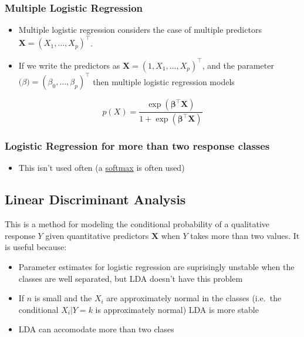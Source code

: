 \documentclass[11pt]{article}
\providecommand{\tightlist}{%
      \setlength{\itemsep}{0pt}\setlength{\parskip}{0pt}}
\begin{document}
    \hypertarget{multiple-logistic-regression}{%
\subsubsection{Multiple Logistic
Regression}\label{multiple-logistic-regression}}

    \begin{itemize}
\item
  Multiple logistic regression considers the case of multiple predictors
  \(\mathbf{X} = (X_1,\dots, X_p)^\top\).
\item
  If we write the predictors as
  \(\mathbf{X} = (1, X_1, \dots, X_p)^\top\), and the parameter
  \(\boldsymbol(\beta) = (\beta_0, \dots, \beta_p)^\top\) then multiple
  logistic regression models
\end{itemize}

\[p(X) = \frac{\exp(\boldsymbol{\beta}^\top \mathbf{X})}{1 + \exp(\boldsymbol{\beta}^\top \mathbf{X})} \]

    \hypertarget{logistic-regression-for-more-than-two-response-classes}{%
\subsubsection{Logistic Regression for more than two response
classes}\label{logistic-regression-for-more-than-two-response-classes}}

    \begin{itemize}
\tightlist
\item
  This isn't used often (a
  \href{https://en.wikipedia.org/wiki/Softmax_function}{softmax} is
  often used)
\end{itemize}

    \hypertarget{linear-discriminant-analysis}{%
\subsection{Linear Discriminant
Analysis}\label{linear-discriminant-analysis}}

    This is a method for modeling the conditional probability of a
qualitative response \(Y\) given quantitative predictors \(\mathbf{X}\)
when \(Y\) takes more than two values. It is useful because:

\begin{itemize}
\item
  Parameter estimates for logistic regression are suprisingly unstable
  when the classes are well separated, but LDA doesn't have this problem
\item
  If \(n\) is small and the \(X_i\) are approximately normal in the
  classes (i.e.~the conditional \(X_i | Y = k\) is approximately normal)
  LDA is more stable
\item
  LDA can accomodate more than two clases
\end{itemize}
\end{document}

